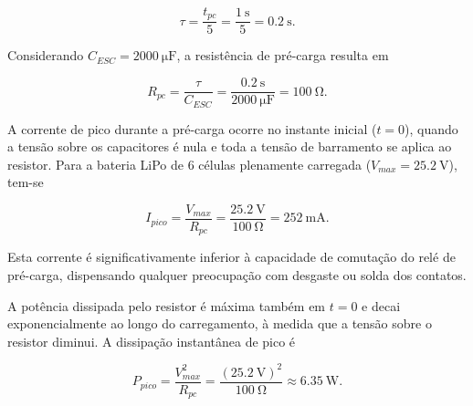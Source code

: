 \begin{equation}
    \tau = \frac{t_{pc}}{5} = \frac{\SI{1}{\second}}{5} = \SI{0,2}{\second}.
    \label{eq:tau_valor}
\end{equation}

Considerando $C_{ESC} = \SI{2000}{\micro\farad}$, a resistência de pré-carga resulta em

\begin{equation}
    R_{pc} = \frac{\tau}{C_{ESC}} = \frac{\SI{0,2}{\second}}{\SI{2000}{\micro\farad}} = \SI{100}{\ohm}.
    \label{eq:rpc_valor}
\end{equation}

A corrente de pico durante a pré-carga ocorre no instante inicial ($t = 0$),
quando a tensão sobre os capacitores é nula e toda a tensão de barramento se
aplica ao resistor. Para a bateria LiPo de 6 células plenamente carregada
($V_{max} = \SI{25,2}{\volt}$), tem-se

\begin{equation}
    I_{pico} = \frac{V_{max}}{R_{pc}} = \frac{\SI{25,2}{\volt}}{\SI{100}{\ohm}} = \SI{252}{\milli\ampere}.
    \label{eq:ipico}
\end{equation}

Esta corrente é significativamente inferior à capacidade de comutação do relé de
pré-carga, dispensando qualquer preocupação com desgaste ou solda dos contatos.

A potência dissipada pelo resistor é máxima também em $t = 0$ e decai
exponencialmente ao longo do carregamento, à medida que a tensão sobre o
resistor diminui. A dissipação instantânea de pico é

\begin{equation}
    P_{pico} = \frac{V_{max}^2}{R_{pc}} = \frac{\left(\SI{25,2}{\volt}\right)^2}{\SI{100}{\ohm}} \approx \SI{6,35}{\watt}.
    \label{eq:ppico}
\end{equation}

